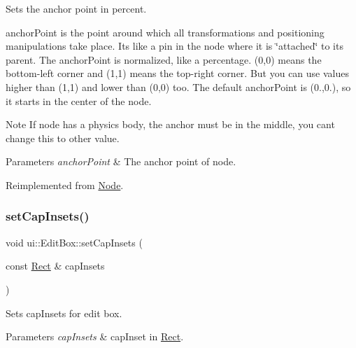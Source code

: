 Sets the anchor point in percent.

anchor\+Point is the point around which all transformations and positioning manipulations take place. It\textquotesingle{}s like a pin in the node where it is \char`\"{}attached\char`\"{} to its parent. The anchor\+Point is normalized, like a percentage. (0,0) means the bottom-\/left corner and (1,1) means the top-\/right corner. But you can use values higher than (1,1) and lower than (0,0) too. The default anchor\+Point is (0.,0.), so it starts in the center of the node. \begin{DoxyNote}{Note}
If node has a physics body, the anchor must be in the middle, you can\textquotesingle{}t change this to other value.
\end{DoxyNote}

\begin{DoxyParams}{Parameters}
{\em anchor\+Point} & The anchor point of node. \\
\hline
\end{DoxyParams}


Reimplemented from \hyperlink{classNode_a4dd45cb48a51df7c257675f527e3f277}{Node}.

\mbox{\label{classui_1_1EditBox_ad02e9879fd52ed960df901a017bde1ff}} 
\subsubsection{\texorpdfstring{set\+Cap\+Insets()}{setCapInsets()}}
{\footnotesize\ttfamily void ui\+::\+Edit\+Box\+::set\+Cap\+Insets (\begin{DoxyParamCaption}\item[{const \hyperlink{classRect}{Rect} \&}]{cap\+Insets }\end{DoxyParamCaption})}

Sets cap\+Insets for edit box.


\begin{DoxyParams}{Parameters}
{\em cap\+Insets} & cap\+Inset in \hyperlink{classRect}{Rect}. \\
\hline
\end{DoxyParams}
\mbox{\label{classui_1_1EditBox_a1167aa7788554bfd537f58ecaca5adc0}} 
